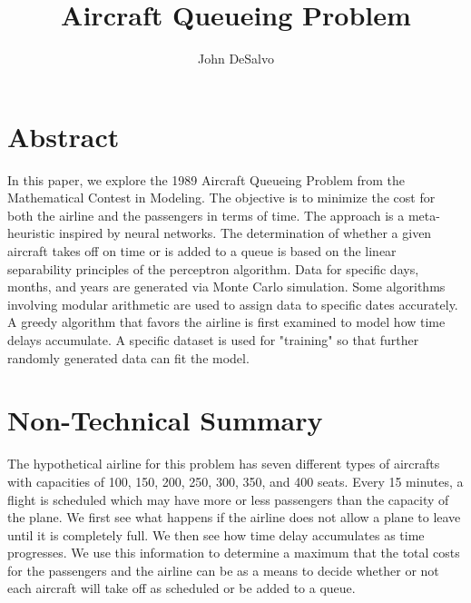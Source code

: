 \documentclass[12pt]{article}
\begin{document}
\pagestyle{plain}
\doublespacing

\title{Aircraft Queueing Problem}
\author{John DeSalvo}
\maketitle

\tableofcontents

\section{Abstract}
In this paper, we explore the 1989 Aircraft Queueing Problem from the Mathematical Contest in Modeling. The objective is to minimize the cost for both the airline and the passengers in terms of time. The approach is a meta-heuristic inspired by neural networks. The determination of whether a given aircraft takes off on time or is added to a queue is based on the linear separability principles of the perceptron algorithm. Data for specific days, months, and years are generated via Monte Carlo simulation. Some algorithms involving modular arithmetic are used to assign data to specific dates accurately. A greedy algorithm that favors the airline is first examined to model how time delays accumulate. A specific dataset is used for "training" so that further randomly generated data can fit the model. 

\section{Non-Technical Summary}
The hypothetical airline for this problem has seven different types of aircrafts with capacities of 100, 150, 200, 250, 300, 350, and 400 seats. Every 15 minutes, a flight is scheduled which may have more or less passengers than the capacity of the plane. We first see what happens if the airline does not allow a plane to leave until it is completely full. We then see how time delay accumulates as time progresses. We use this information to determine a maximum that the total costs for the passengers and the airline can be as a means to decide whether or not each aircraft will take off as scheduled or be added to a queue.
\end{document}
